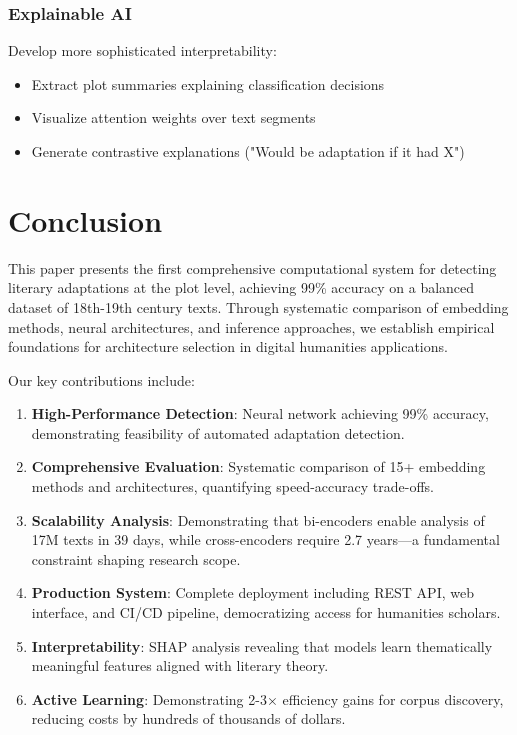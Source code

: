 \documentclass[12pt,a4paper]{article}
\begin{document}
\subsubsection{Explainable AI}

Develop more sophisticated interpretability:
\begin{itemize}
    \item Extract plot summaries explaining classification decisions
    \item Visualize attention weights over text segments
    \item Generate contrastive explanations ("Would be adaptation if it had X")
\end{itemize}

\section{Conclusion}

This paper presents the first comprehensive computational system for detecting literary adaptations at the plot level, achieving 99\% accuracy on a balanced dataset of 18th-19th century texts. Through systematic comparison of embedding methods, neural architectures, and inference approaches, we establish empirical foundations for architecture selection in digital humanities applications.

Our key contributions include:

\begin{enumerate}
    \item \textbf{High-Performance Detection}: Neural network achieving 99\% accuracy, demonstrating feasibility of automated adaptation detection.

    \item \textbf{Comprehensive Evaluation}: Systematic comparison of 15+ embedding methods and architectures, quantifying speed-accuracy trade-offs.

    \item \textbf{Scalability Analysis}: Demonstrating that bi-encoders enable analysis of 17M texts in 39 days, while cross-encoders require 2.7 years—a fundamental constraint shaping research scope.

    \item \textbf{Production System}: Complete deployment including REST API, web interface, and CI/CD pipeline, democratizing access for humanities scholars.

    \item \textbf{Interpretability}: SHAP analysis revealing that models learn thematically meaningful features aligned with literary theory.

    \item \textbf{Active Learning}: Demonstrating 2-3× efficiency gains for corpus discovery, reducing costs by hundreds of thousands of dollars.
\end{enumerate}
\end{document}
